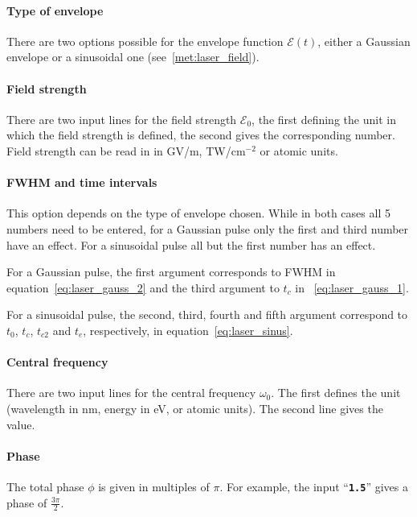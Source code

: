 \documentclass[a4paper,10pt,DIV=15,openany,twoside=false]{scrbook}
\newcommand{\ttt}[1]{\textbf{\texttt{#1}}}
\begin{document}
\paragraph{Type of envelope}

There are two options possible for the envelope function $\mathcal{E}(t)$, either a Gaussian envelope or a sinusoidal one (see~\ref{met:laser_field}).

\paragraph{Field strength}

There are two input lines for the field strength $\mathcal{E}_0$, the first defining the unit in which the field strength is defined, the second gives the corresponding number. Field strength can be read in in GV/m, TW/cm$^{-2}$ or atomic units.

\paragraph{FWHM and time intervals}

This option depends on the type of envelope chosen. While in both cases all 5 numbers need to be entered, for a Gaussian pulse only the first and third number have an effect. For a sinusoidal pulse all but the first number has an effect.

For a Gaussian pulse, the first argument corresponds to FWHM in equation~\eqref{eq:laser_gauss_2} and the third argument to $t_c$ in ~\eqref{eq:laser_gauss_1}.

For a sinusoidal pulse, the second, third, fourth and fifth argument correspond to $t_0$, $t_c$, $t_{c2}$ and $t_e$, respectively, in equation~\eqref{eq:laser_sinus}.

\paragraph{Central frequency}

There are two input lines for the central frequency $\omega_0$. The first defines the unit (wavelength in nm, energy in eV, or atomic units). The second line gives the value.

\paragraph{Phase}

The total phase $\phi$ is given in multiples of $\pi$. For example, the input ``\ttt{1.5}'' gives a phase of $\frac{3\pi}{2}$.
\end{document}
